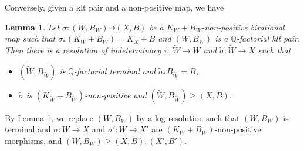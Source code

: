\documentclass[11pt]{amsart}
\newtheorem{lem}[defn]{Lemma}
\begin{document}
Conversely, given a klt pair and a non-positive map, we have
\begin{lem}\label{terminalresolution}
  \cite[Lemma 3.5]{liuSarkisovProgramGeneralized2021} Let $\sigma:(W,B_W)\dashrightarrow (X,B)$ be a $K_W+B_W$-non-positive birational map such that $\sigma_*(K_W+B_W)=K_X+B$ and $(W,B_W)$ is a $\mathbb{Q}$-factorial klt pair. Then there is a resolution of indeterminacy $\pi:\tilde{W}\to W $ and $\tilde{\sigma}:\tilde{W}\to X$ such that
\begin{itemize}
  \item $(\tilde{W},B_{\tilde{W}})$ is $\mathbb{Q}$-factorial terminal and $\tilde{\sigma}_*B_{\tilde{W}}=B$,
  \item $\tilde{\sigma}$ is $(K_{\tilde{W}}+B_{\tilde{W}})$-non-positive and $(\tilde{W},B_{\tilde{W}})\geqslant (X,B)$.
\end{itemize}
\end{lem}

By Lemma \ref{terminalresolution}, we  replace $(W,B_W)$ by a log resolution such that $(W,B_{W})$ is terminal and $\sigma:W\to X$ and $\sigma':W\to X'$ are $(K_W+B_W)$-non-positive morphisms, and $(W,B_W)\geqslant (X,B),(X',B')$. 
\end{document}
